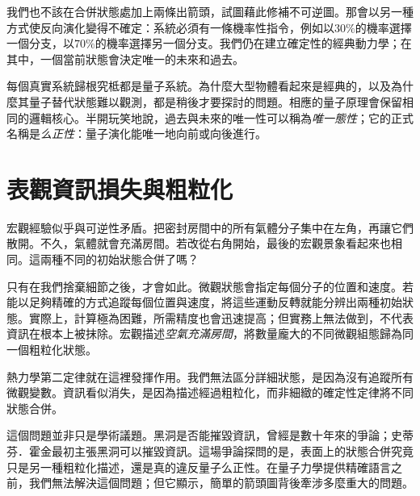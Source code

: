 \begin{classroomqa}
\end{classroomqa}

我們也不該在合併狀態處加上兩條出箭頭，試圖藉此修補不可逆圖。那會以另一種方式使反向演化變得不確定：系統必須有一條機率性指令，例如以\(30\%\)的機率選擇一個分支，以\(70\%\)的機率選擇另一個分支。我們仍在建立確定性的經典動力學；在其中，一個當前狀態會決定唯一的未來和過去。

每個真實系統歸根究柢都是量子系統。為什麼大型物體看起來是經典的，以及為什麼其量子替代狀態難以觀測，都是稍後才要探討的問題。相應的量子原理會保留相同的邏輯核心。半開玩笑地說，過去與未來的唯一性可以稱為\emph{唯一態性}；它的正式名稱是\emph{么正性}：量子演化能唯一地向前或向後進行。

\section{表觀資訊損失與粗粒化}

宏觀經驗似乎與可逆性矛盾。把密封房間中的所有氣體分子集中在左角，再讓它們散開。不久，氣體就會充滿房間。若改從右角開始，最後的宏觀景象看起來也相同。這兩種不同的初始狀態合併了嗎？

只有在我們捨棄細節之後，才會如此。微觀狀態會指定每個分子的位置和速度。若能以足夠精確的方式追蹤每個位置與速度，將這些運動反轉就能分辨出兩種初始狀態。實際上，計算極為困難，所需精度也會迅速提高；但實務上無法做到，不代表資訊在根本上被抹除。宏觀描述\emph{空氣充滿房間}，將數量龐大的不同微觀組態歸為同一個粗粒化狀態。

熱力學第二定律就在這裡發揮作用。我們無法區分詳細狀態，是因為沒有追蹤所有微觀變數。資訊看似消失，是因為描述經過粗粒化，而非細緻的確定性定律將不同狀態合併。

\begin{classroomqa}
\end{classroomqa}

這個問題並非只是學術議題。黑洞是否能摧毀資訊，曾經是數十年來的爭論；史蒂芬．霍金最初主張黑洞可以摧毀資訊。這場爭論探問的是，表面上的狀態合併究竟只是另一種粗粒化描述，還是真的違反量子么正性。在量子力學提供精確語言之前，我們無法解決這個問題；但它顯示，簡單的箭頭圖背後牽涉多麼重大的問題。

